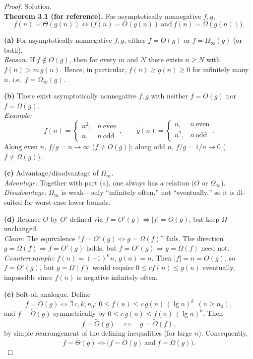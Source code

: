 \documentclass[12pt]{article}
\theoremstyle{definition}
\begin{document}
\begin{proof}
Solution. \\[-0.5ex]

\noindent\textbf{Theorem 3.1 (for reference).} For asymptotically nonnegative $f,g$,
\[
f(n)=\Theta(g(n)) \iff \big(f(n)=O(g(n)) \ \text{and}\ f(n)=\Omega(g(n))\big).
\]

\medskip
\noindent\textbf{(a)} For asymptotically nonnegative $f,g$, either $f=O(g)$ or $f=\Omega_\infty(g)$ (or both).\\
\emph{Reason:} If $f\notin O(g)$, then for every $m$ and $N$ there exists $n\ge N$ with $f(n)>m\,g(n)$. Hence, in particular, $f(n)\ge g(n)\ge 0$ for infinitely many $n$, i.e.\ $f=\Omega_\infty(g)$.

\medskip
\noindent\textbf{(b)} There exist asymptotically nonnegative $f,g$ with neither $f=O(g)$ nor $f=\Omega(g)$.\\
\emph{Example:}
\[
f(n)=\begin{cases}n^2,&n\ \text{even}\\ n,&n\ \text{odd}\end{cases},
\qquad
g(n)=\begin{cases}n,&n\ \text{even}\\ n^2,&n\ \text{odd}\end{cases}.
\]
Along even $n$, $f/g=n\to\infty$ ($f\not=O(g)$); along odd $n$, $f/g=1/n\to 0$ ($f\not=\Omega(g)$).

\medskip
\noindent\textbf{(c)} Advantage/disadvantage of $\Omega_\infty$.\\
\emph{Advantage:} Together with part (a), one always has a relation ($O$ or $\Omega_\infty$).\\
\emph{Disadvantage:} $\Omega_\infty$ is weak—only “infinitely often,” not “eventually,” so it is ill-suited for worst-case lower bounds.

\medskip
\noindent\textbf{(d)} Replace $O$ by $O'$ defined via $f=O'(g)\iff |f|=O(g)$, but keep $\Omega$ unchanged.\\
\emph{Claim:} The equivalence “$f=O'(g)\iff g=\Omega(f)$” fails.  The direction $g=\Omega(f)\Rightarrow f=O'(g)$ holds, but $f=O'(g)\Rightarrow g=\Omega(f)$ need not.\\
\emph{Counterexample:} $f(n)=(-1)^n n$, $g(n)=n$. Then $|f|=n=O(g)$, so $f=O'(g)$, but $g=\Omega(f)$ would require $0\le c f(n)\le g(n)$ eventually, impossible since $f(n)$ is negative infinitely often.

\medskip
\noindent\textbf{(e)} Soft-oh analogue.  Define
\[
f=\tilde{O}(g)\iff \exists\,c,k,n_0:\ 0\le f(n)\le c\,g(n)\,(\lg n)^k \ \ (n\ge n_0),
\]
and $f=\tilde{\Omega}(g)$ symmetrically by $0\le c\,g(n)\le f(n)\,(\lg n)^k$. Then
\[
f=\tilde{O}(g)\quad\Longleftrightarrow\quad g=\tilde{\Omega}(f),
\]
by simple rearrangement of the defining inequalities (for large $n$). Consequently,
\[
f=\tilde{\Theta}(g)\iff \big(f=\tilde{O}(g)\ \text{and}\ f=\tilde{\Omega}(g)\big).
\]


\end{proof}
\end{document}

